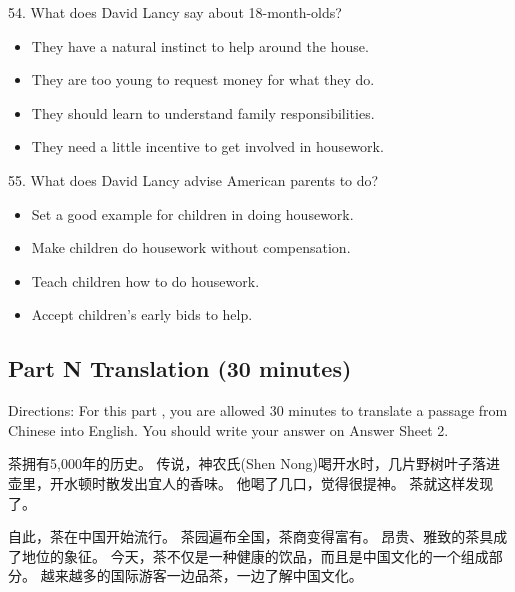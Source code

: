 \documentclass[UTF8,11pt]{ctexart}
\begin{document}
54. What does David Lancy say about 18-month-olds?


\begin{itemize}[leftmargin=2em,itemsep=.2em,topsep=.4em]\item[A.] They have a natural instinct to help around the house.
\item[B.] They are too young to request money for what they do.
\item[C.] They should learn to understand family responsibilities.
\item[D.] They need a little incentive to get involved in housework.
\end{itemize}

55. What does David Lancy advise American parents to do?


\begin{itemize}[leftmargin=2em,itemsep=.2em,topsep=.4em]\item[A.] Set a good example for children in doing housework.
\item[B.] Make children do housework without compensation.
\item[C.] Teach children how to do housework.
\item[D.] Accept children's early bids to help.
\end{itemize}

\subsection*{Part N Translation (30 minutes)}


Directions: For this part , you are allowed 30 minutes to translate a passage from Chinese into English. You should write your answer on Answer Sheet 2.


茶拥有5,000年的历史。 传说，神农氏(Shen Nong)喝开水时，几片野树叶子落进壶里，开水顿时散发出宜人的香味。 他喝了几口，觉得很提神。 茶就这样发现了。


自此，茶在中国开始流行。 茶园遍布全国，茶商变得富有。 昂贵、雅致的茶具成了地位的象征。 今天，茶不仅是一种健康的饮品，而且是中国文化的一个组成部分。 越来越多的国际游客一边品茶，一边了解中国文化。
\end{document}
